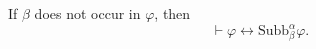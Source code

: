 If $\beta$ does not occur in $\varphi$, then
$$\vdash \varphi \leftrightarrow \text{Subb}_{\beta}^{\alpha} \varphi.$$

